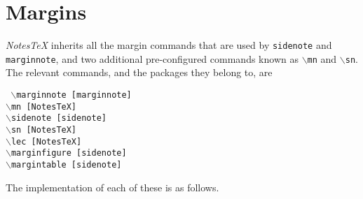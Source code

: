 \documentclass[10pt]{article}
\begin{document}

	\section{Margins}\label{Sec:Margins}%
	\textit{NotesTeX} inherits all the margin commands that are used by \texttt{sidenote} and \texttt{marginnote}, and two additional pre-configured commands known as \texttt{$\backslash$mn} and \texttt{$\backslash$sn}. The relevant commands, and the packages they belong to, are
	\begin{center}
		\begin{multicols}{2}
		\noindent\texttt{
		$\backslash$marginnote~[marginnote]\\
		$\backslash$mn~[NotesTeX]\\
		$\backslash$sidenote~[sidenote]\\
		$\backslash$sn~[NotesTeX]\\
		$\backslash$lec~[NotesTeX]\\
		$\backslash$marginfigure~[sidenote]\\
		$\backslash$margintable~[sidenote]\\
		}
	\end{multicols}
	\end{center}
	The implementation of each of these is as follows.
\end{document}

